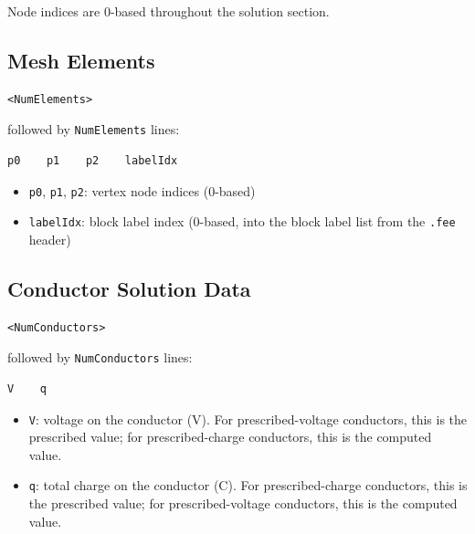 \documentclass[11pt]{article}
\begin{document}
Node indices are 0-based throughout the solution section.

\subsection{Mesh Elements}

\begin{lstlisting}
<NumElements>
\end{lstlisting}

followed by \texttt{NumElements} lines:

\begin{lstlisting}
p0    p1    p2    labelIdx
\end{lstlisting}

\begin{itemize}[nosep]
  \item \texttt{p0}, \texttt{p1}, \texttt{p2}: vertex node indices (0-based)
  \item \texttt{labelIdx}: block label index (0-based, into the block
        label list from the \texttt{.fee} header)
\end{itemize}

\subsection{Conductor Solution Data}

\begin{lstlisting}
<NumConductors>
\end{lstlisting}

followed by \texttt{NumConductors} lines:

\begin{lstlisting}
V    q
\end{lstlisting}

\begin{itemize}[nosep]
  \item \texttt{V}: voltage on the conductor (V).  For prescribed-voltage
        conductors, this is the prescribed value; for prescribed-charge
        conductors, this is the computed value.
  \item \texttt{q}: total charge on the conductor (C).  For
        prescribed-charge conductors, this is the prescribed value; for
        prescribed-voltage conductors, this is the computed value.
\end{itemize}
\end{document}
